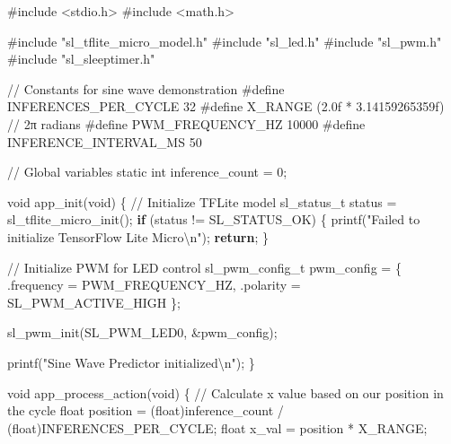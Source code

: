 \documentclass[
  9pt,
  letterpaper,
  abstract,
  titlepage]{scrbook}
\newenvironment{Shaded}{\begin{snugshade}}{\end{snugshade}}
\newcommand{\BuiltInTok}[1]{\textcolor[rgb]{0.00,0.23,0.31}{#1}}
\newcommand{\CommentTok}[1]{\textcolor[rgb]{0.37,0.37,0.37}{#1}}
\newcommand{\ControlFlowTok}[1]{\textcolor[rgb]{0.00,0.23,0.31}{\textbf{#1}}}
\newcommand{\DataTypeTok}[1]{\textcolor[rgb]{0.68,0.00,0.00}{#1}}
\newcommand{\DecValTok}[1]{\textcolor[rgb]{0.68,0.00,0.00}{#1}}
\newcommand{\FloatTok}[1]{\textcolor[rgb]{0.68,0.00,0.00}{#1}}
\newcommand{\ImportTok}[1]{\textcolor[rgb]{0.00,0.46,0.62}{#1}}
\newcommand{\NormalTok}[1]{\textcolor[rgb]{0.00,0.23,0.31}{#1}}
\newcommand{\OperatorTok}[1]{\textcolor[rgb]{0.37,0.37,0.37}{#1}}
\newcommand{\PreprocessorTok}[1]{\textcolor[rgb]{0.68,0.00,0.00}{#1}}
\newcommand{\SpecialCharTok}[1]{\textcolor[rgb]{0.37,0.37,0.37}{#1}}
\newcommand{\StringTok}[1]{\textcolor[rgb]{0.13,0.47,0.30}{#1}}
\begin{document}
\begin{Shaded}
\begin{Highlighting}[]
\PreprocessorTok{\#include }\ImportTok{\textless{}stdio.h\textgreater{}}
\PreprocessorTok{\#include }\ImportTok{\textless{}math.h\textgreater{}}

\PreprocessorTok{\#include }\ImportTok{"sl\_tflite\_micro\_model.h"}
\PreprocessorTok{\#include }\ImportTok{"sl\_led.h"}
\PreprocessorTok{\#include }\ImportTok{"sl\_pwm.h"}
\PreprocessorTok{\#include }\ImportTok{"sl\_sleeptimer.h"}

\CommentTok{// Constants for sine wave demonstration}
\PreprocessorTok{\#define INFERENCES\_PER\_CYCLE  }\DecValTok{32}
\PreprocessorTok{\#define X\_RANGE               }\OperatorTok{(}\FloatTok{2.0}\BuiltInTok{f}\PreprocessorTok{ }\OperatorTok{*}\PreprocessorTok{ }\FloatTok{3.14159265359}\BuiltInTok{f}\OperatorTok{)}\PreprocessorTok{  }\CommentTok{// 2π radians}
\PreprocessorTok{\#define PWM\_FREQUENCY\_HZ      }\DecValTok{10000}
\PreprocessorTok{\#define INFERENCE\_INTERVAL\_MS }\DecValTok{50}

\CommentTok{// Global variables}
\DataTypeTok{static} \DataTypeTok{int}\NormalTok{ inference\_count }\OperatorTok{=} \DecValTok{0}\OperatorTok{;}

\DataTypeTok{void}\NormalTok{ app\_init}\OperatorTok{(}\DataTypeTok{void}\OperatorTok{)}
\OperatorTok{\{}
  \CommentTok{// Initialize TFLite model}
\NormalTok{  sl\_status\_t status }\OperatorTok{=}\NormalTok{ sl\_tflite\_micro\_init}\OperatorTok{();}
  \ControlFlowTok{if} \OperatorTok{(}\NormalTok{status }\OperatorTok{!=}\NormalTok{ SL\_STATUS\_OK}\OperatorTok{)} \OperatorTok{\{}
\NormalTok{    printf}\OperatorTok{(}\StringTok{"Failed to initialize TensorFlow Lite Micro}\SpecialCharTok{\textbackslash{}n}\StringTok{"}\OperatorTok{);}
    \ControlFlowTok{return}\OperatorTok{;}
  \OperatorTok{\}}
  
  \CommentTok{// Initialize PWM for LED control}
\NormalTok{  sl\_pwm\_config\_t pwm\_config }\OperatorTok{=} \OperatorTok{\{}
    \OperatorTok{.}\NormalTok{frequency }\OperatorTok{=}\NormalTok{ PWM\_FREQUENCY\_HZ}\OperatorTok{,}
    \OperatorTok{.}\NormalTok{polarity }\OperatorTok{=}\NormalTok{ SL\_PWM\_ACTIVE\_HIGH}
  \OperatorTok{\};}
  
\NormalTok{  sl\_pwm\_init}\OperatorTok{(}\NormalTok{SL\_PWM\_LED0}\OperatorTok{,} \OperatorTok{\&}\NormalTok{pwm\_config}\OperatorTok{);}
  
\NormalTok{  printf}\OperatorTok{(}\StringTok{"Sine Wave Predictor initialized}\SpecialCharTok{\textbackslash{}n}\StringTok{"}\OperatorTok{);}
\OperatorTok{\}}

\DataTypeTok{void}\NormalTok{ app\_process\_action}\OperatorTok{(}\DataTypeTok{void}\OperatorTok{)}
\OperatorTok{\{}
  \CommentTok{// Calculate x value based on our position in the cycle}
  \DataTypeTok{float}\NormalTok{ position }\OperatorTok{=} \OperatorTok{(}\DataTypeTok{float}\OperatorTok{)}\NormalTok{inference\_count }\OperatorTok{/} \OperatorTok{(}\DataTypeTok{float}\OperatorTok{)}\NormalTok{INFERENCES\_PER\_CYCLE}\OperatorTok{;}
  \DataTypeTok{float}\NormalTok{ x\_val }\OperatorTok{=}\NormalTok{ position }\OperatorTok{*}\NormalTok{ X\_RANGE}\OperatorTok{;}
  

\end{Highlighting}
\end{Shaded}
\end{document}
